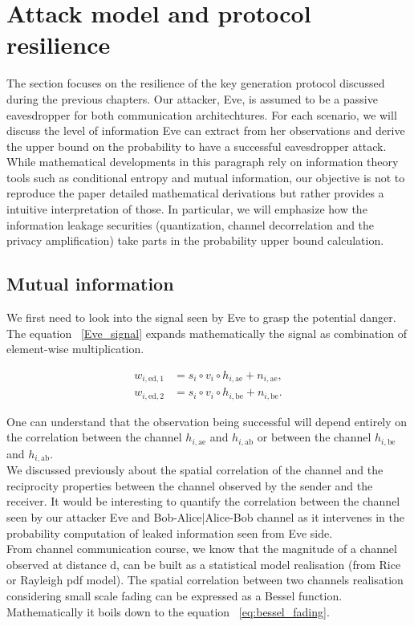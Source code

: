 \chapter{Attack model and protocol resilience}

The section focuses on the resilience of the key generation protocol discussed during the previous chapters.  Our attacker, Eve, is assumed to be a passive eavesdropper for both communication architechtures. For each scenario, we will discuss the level of information Eve can extract from her observations and derive the upper bound on the probability to have a successful eavesdropper attack. While mathematical developments in this paragraph rely on information theory tools such as conditional entropy and mutual information, our objective is not to reproduce the paper detailed mathematical derivations but rather provides a intuitive interpretation of those. In particular, we will emphasize how the information leakage securities (quantization, channel decorrelation and the privacy amplification) take parts in the probability upper bound calculation.

\section{Mutual information}

We first need to look into the signal seen by Eve to grasp the potential danger.  The equation ~\ref{Eve_signal} expands mathematically the signal as combination of element-wise multiplication.

\begin{align}
w_{i,\mathrm{ed},1} &= s_i \circ v_i \circ h_{i,\mathrm{ae}} + n_{i,\mathrm{ae}},\\
w_{i,\mathrm{ed},2} &= s_i \circ v_i \circ h_{i,\mathrm{be}} + n_{i,\mathrm{be}}.
\label{Eve_signal}
\end{align}

One can understand that the observation being successful will depend entirely on the correlation between the channel $h_{i,\mathrm{ae}}$ and $h_{i,\mathrm{ab}}$ or between the channel $h_{i,\mathrm{be}}$ and $h_{i,\mathrm{ab}}$.\\
We discussed previously about the spatial correlation of the channel and the reciprocity properties between the channel observed by the sender and the receiver.  It would be interesting to quantify the correlation between the channel seen by our attacker Eve and Bob-Alice|Alice-Bob channel as it intervenes in the probability computation of leaked information seen from Eve side.\\
From channel communication course, we know that the magnitude of a channel observed at distance d, can be built as a statistical model realisation (from Rice or Rayleigh pdf model).  The spatial correlation between two channels realisation considering small scale fading can be expressed as a Bessel function.  Mathematically it boils down to the equation ~\ref{eq:bessel_fading}.

